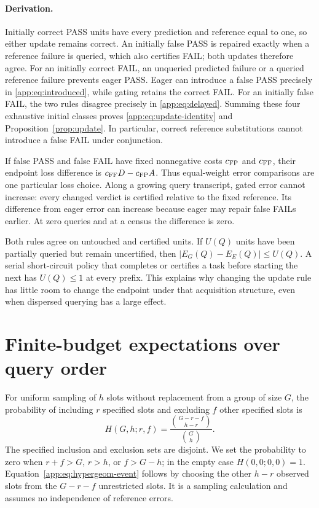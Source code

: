 \paragraph{Derivation.}
Initially correct PASS units have every prediction and reference equal to
one, so either update remains correct. An initially false PASS is repaired
exactly when a reference failure is queried, which also certifies FAIL; both
updates therefore agree. For an initially correct FAIL, an unqueried
predicted failure or a queried reference failure prevents eager PASS. Eager
can introduce a false PASS precisely in \eqref{app:eq:introduced}, while
gating retains the correct FAIL. For an initially false FAIL, the two rules
disagree precisely in \eqref{app:eq:delayed}. Summing these four exhaustive
initial classes proves \eqref{app:eq:update-identity} and Proposition~\ref{prop:update}. In particular, correct
reference substitutions cannot introduce a false FAIL under conjunction.

If false PASS and false FAIL have fixed nonnegative costs $c_{\rm FP}$ and
$c_{\rm FF}$, their endpoint loss difference is
$c_{\rm FF}D-c_{\rm FP}A$. Thus equal-weight error comparisons are one
particular loss choice. Along a growing query transcript, gated error cannot
increase: every changed verdict is certified relative to the fixed
reference. Its difference from eager error can increase because eager may
repair false FAILs earlier. At zero queries and at a census the difference
is zero.

Both rules agree on untouched and certified units. If $U(Q)$ units have been
partially queried but remain uncertified, then
$|E_G(Q)-E_E(Q)|\leq U(Q)$. A serial short-circuit policy that completes or
certifies a task before starting the next has $U(Q)\leq1$ at every prefix.
This explains why changing the update rule has little room to change the
endpoint under that acquisition structure, even when dispersed querying has
a large effect.

\section{Finite-budget expectations over query order}
\label{app:expectations}

For uniform sampling of $h$ slots without replacement from a group of size
$G$, the probability of including $r$ specified slots and excluding $f$
other specified slots is
\begin{equation}
 H(G,h;r,f)=\frac{\binom{G-r-f}{h-r}}{\binom{G}{h}}.
 \label{app:eq:hypergeom-event}
\end{equation}
The specified inclusion and exclusion sets are disjoint. We set the
probability to zero when $r+f>G$, $r>h$, or $f>G-h$; in the empty case
$H(0,0;0,0)=1$. Equation~\eqref{app:eq:hypergeom-event} follows by choosing
the other $h-r$ observed slots from the $G-r-f$ unrestricted slots. It is a
sampling calculation and assumes no independence of reference errors.

